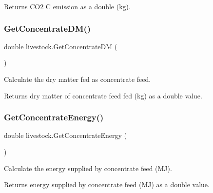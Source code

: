 Returns C\+O2 C emission as a double (kg). 

\mbox{\label{classlivestock_aae3e79cb0aad2d69a5a1a2a97956f23b}} 
\subsubsection{\texorpdfstring{GetConcentrateDM()}{GetConcentrateDM()}}
{\footnotesize\ttfamily double livestock.\+Get\+Concentrate\+DM (\begin{DoxyParamCaption}{ }\end{DoxyParamCaption})\hspace{0.3cm}{\ttfamily [inline]}}



Calculate the dry matter fed as concentrate feed. 

\begin{DoxyReturn}{Returns}
dry matter of concentrate feed fed (kg) as a double value. 
\end{DoxyReturn}
\mbox{\label{classlivestock_aa8d54b87c79101f0633184a7929d5ab9}} 
\subsubsection{\texorpdfstring{GetConcentrateEnergy()}{GetConcentrateEnergy()}}
{\footnotesize\ttfamily double livestock.\+Get\+Concentrate\+Energy (\begin{DoxyParamCaption}{ }\end{DoxyParamCaption})\hspace{0.3cm}{\ttfamily [inline]}}



Calculate the energy supplied by concentrate feed (MJ). 

\begin{DoxyReturn}{Returns}
energy supplied by concentrate feed (MJ) as a double value. 
\end{DoxyReturn}
\mbox{\label{classlivestock_a4df46ad1b9a5b4bd3d8a70de6f84e17b}} 

